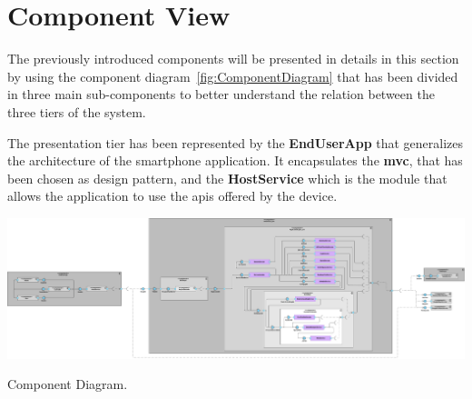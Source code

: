 \section{Component View}

The previously introduced components will be presented in details in this section by using the component diagram~\ref{fig:ComponentDiagram} that has been divided in three main sub-components to better understand the relation between the three tiers of the system.

The presentation tier has been represented by the \textbf{EndUserApp} that generalizes the architecture of the smartphone application.
It encapsulates the \textbf{\gls{mvc}}, that has been chosen as design pattern, and the \textbf{HostService} which is the module that allows the application to use the \glspl{api} offered by the device.

\begin{table} %
	\centering
	\includegraphics[width=1.0\textwidth]{images/component_diagram.pdf}
	\caption{Component Diagram.}\label{fig:ComponentDiagram}
\end{table} %

